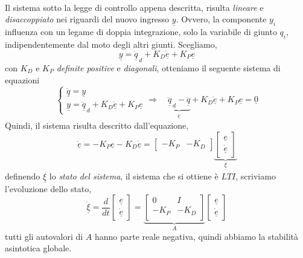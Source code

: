 \paragraph{}
Il sistema sotto la legge di controllo appena descritta, risulta \emph{lineare} e \emph{disaccoppiato} nei riguardi del nuovo ingresso $\underline{y}$. Ovvero, la componente $y_i$ influenza con un legame di doppia integrazione, solo la variabile di giunto $q_i$, indipendentemente dal moto degli altri giunti. Scegliamo,
\begin{equation}
	\underline{y} = \underline{\ddot{q}}_{\,d} + K_D \underline{\dot{e}} + K_P \underline{e}
\end{equation}
con $K_D$ e $K_P$ \emph{definite positive} e \emph{diagonali}, otteniamo il seguente sistema di equazioni
\begin{equation}
	\begin{cases}
		\underline{\ddot{q}} = \underline{y} \\
		\underline{y} = \underline{\ddot{q}}_{\,d} + K_D \underline{\dot{e}} + K_P \underline{e}
	\end{cases}
	\Rightarrow \quad
	\underbrace{\underline{\ddot{q}}_{\,d} - \underline{\ddot{q}}}_{\underline{\ddot{e}}} + K_D \underline{\dot{e}} + K_P \underline{e} = \underline{0}
\end{equation}
Quindi, il sistema risulta descritto dall'equazione,
\begin{equation}
	\underline{\ddot{e}} = -K_P \underline{e} - K_D \underline{\dot{e}} = 
	\begin{bmatrix}
		- K_P & - K_D
	\end{bmatrix}
	\underbrace{
	\begin{bmatrix}
		\underline{e} \\
		\underline{\dot{e}}
	\end{bmatrix}
	}_{\underline{\xi}}
\end{equation}
definendo $\underline{\xi}$ lo \emph{stato del sistema}, il sistema che si ottiene è $LTI$, scriviamo l'evoluzione dello stato,
\begin{equation}
	\underline{\dot{\xi}} = \frac{d}{dt} 
	\begin{bmatrix}
		\underline{e} \\
		\underline{\dot{e}}
	\end{bmatrix}
	= 
	\underbrace{
	\begin{bmatrix}
		0 & I \\
		-K_P & - K_D \\
	\end{bmatrix}
	}_{A}
	\begin{bmatrix}
		\underline{e} \\
		\underline{\dot{e}}
	\end{bmatrix}	
\end{equation} 
tutti gli autovalori di $A$ hanno parte reale negativa, quindi abbiamo la stabilità asintotica globale.

